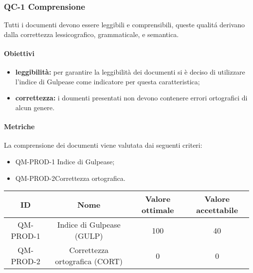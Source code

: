 \subsubsection{QC-1 Comprensione}
Tutti i documenti devono essere leggibili e comprensibili, queste qualitá derivano dalla correttezza lessicografico, grammaticale, e semantica.
	\paragraph{Obiettivi}
		\begin{itemize}
			\item \textbf{leggibilità:} per garantire la leggibilità dei documenti si è deciso di utilizzare l'indice di Gulpease come indicatore per questa caratteristica;
			\item \textbf{correttezza:} i doumenti presentati non devono contenere errori ortografici di alcun genere.
		\end{itemize}
	\paragraph{Metriche}
	La comprensione dei documenti viene valutata dai seguenti criteri:
	\begin{itemize}
		\item QM-PROD-1 Indice di Gulpease;
    \item QM-PROD-2Correttezza ortografica.
	\end{itemize}
	\begin{center}
		\begin{tabular}{|c|c|c|c|}
			\rowcolor{lighter-grayer}
			\hline
			ID & Nome & Valore ottimale & Valore accettabile \\
			\hline
			QM-PROD-1 & Indice di Gulpease (GULP) & 100 & 40 \\
      \hline
			QM-PROD-2 & Correttezza ortografica (CORT) & 0 & 0 \\
			\hline
		\end{tabular}
	\end{center}
